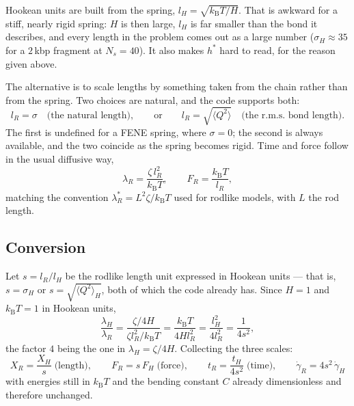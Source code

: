 \documentclass[11pt,a4paper]{report}
\newcommand{\kB}{k_\mathrm{B}}
\begin{document}
Hookean units are built from the spring, $l_H = \sqrt{\kB T/H}$. That is awkward
for a stiff, nearly rigid spring: $H$ is then large, $l_H$ is far smaller than the
bond it describes, and every length in the problem comes out as a large number
($\sigma_H \approx 35$ for a $2$\,kbp fragment at $N_s = 40$). It also makes
$h^{*}$ hard to read, for the reason given above.

The alternative is to scale lengths by something taken from the chain rather than
from the spring. Two choices are natural, and the code supports both:
\begin{equation}
  l_R = \sigma \quad\text{(the natural length)},
  \qquad\text{or}\qquad
  l_R = \sqrt{\langle Q^{2}\rangle} \quad\text{(the r.m.s.\ bond length)}.
\end{equation}
The first is undefined for a FENE spring, where $\sigma = 0$; the second is always
available, and the two coincide as the spring becomes rigid. Time and force follow
in the usual diffusive way,
\begin{equation}
  \lambda_R = \frac{\zeta\, l_R^{2}}{\kB T},
  \qquad
  F_R = \frac{\kB T}{l_R},
\end{equation}
matching the convention $\lambda^{*}_R = L^{2}\zeta/\kB T$ used for rodlike models,
with $L$ the rod length.

\subsection{Conversion}

Let $s = l_R/l_H$ be the rodlike length unit expressed in Hookean units --- that
is, $s = \sigma_H$ or $s = \sqrt{\langle Q^{2}\rangle_H}$, both of which the code
already has. Since $H = 1$ and $\kB T = 1$ in Hookean units,
\begin{equation}
  \frac{\lambda_H}{\lambda_R}
    = \frac{\zeta/4H}{\zeta l_R^{2}/\kB T}
    = \frac{\kB T}{4 H l_R^{2}}
    = \frac{l_H^{2}}{4 l_R^{2}}
    = \frac{1}{4s^{2}},
\end{equation}
the factor $4$ being the one in $\lambda_H = \zeta/4H$. Collecting the three
scales:
\begin{equation}
  \boxed{\;
  X_R = \frac{X_H}{s} \;\text{(length)},
  \qquad
  F_R = s\,F_H \;\text{(force)},
  \qquad
  t_R = \frac{t_H}{4s^{2}} \;\text{(time)},
  \qquad
  \dot\gamma_R = 4s^{2}\,\dot\gamma_H \;}
\end{equation}
with energies still in $\kB T$ and the bending constant $C$ already dimensionless
and therefore unchanged.
\end{document}
